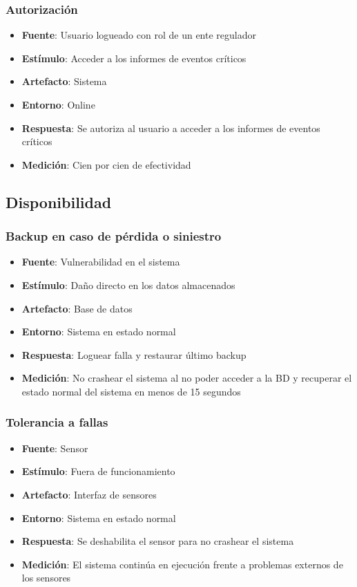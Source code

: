 \subsubsection{Autorización}
\begin{itemize}
\item {\bf Fuente}: Usuario logueado con rol de un ente regulador
\item {\bf Estímulo}: Acceder a los informes de eventos críticos
\item {\bf Artefacto}: Sistema
\item {\bf Entorno}: Online
\item {\bf Respuesta}: Se autoriza al usuario a acceder a los informes de eventos críticos
\item {\bf Medición}: Cien por cien de efectividad
\end{itemize}

\subsection{Disponibilidad}

\subsubsection{Backup en caso de pérdida o siniestro}
\begin{itemize}
\item {\bf Fuente}: Vulnerabilidad en el sistema
\item {\bf Estímulo}: Daño directo en los datos almacenados
\item {\bf Artefacto}: Base de datos
\item {\bf Entorno}: Sistema en estado normal
\item {\bf Respuesta}: Loguear falla y restaurar último backup
\item {\bf Medición}: No crashear el sistema al no poder acceder a la BD y recuperar el estado normal del sistema en menos de 15 segundos 
\end{itemize}

\subsubsection{Tolerancia a fallas}
\begin{itemize}
\item {\bf Fuente}: Sensor
\item {\bf Estímulo}: Fuera de funcionamiento
\item {\bf Artefacto}: Interfaz de sensores
\item {\bf Entorno}: Sistema en estado normal
\item {\bf Respuesta}: Se deshabilita el sensor para no crashear el sistema
\item {\bf Medición}: El sistema continúa en ejecución frente a problemas externos de los sensores
\end{itemize}

